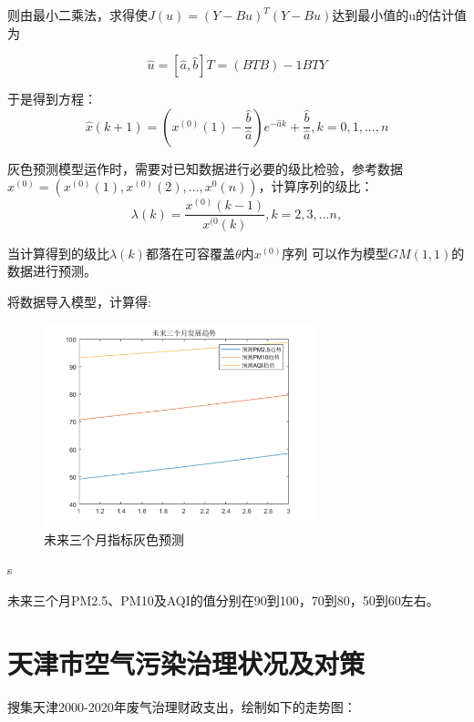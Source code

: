 \documentclass[UTF8]{ctexart}
\begin{document}
则由最小二乘法，求得使$J(u)=(Y-Bu)^T(Y-Bu)$达到最小值的u的估计值为

\begin{equation}
    \hat{u}=[\hat{a},\hat{b}]T=(BTB)-1BTY
\end{equation}

于是得到方程：
\begin{equation}
    \hat{x}(k+1)=(x^{(0)}(1)-\frac{\hat{b}}{\hat{a}})e^{-\hat{a}k}+\frac{\hat{b}}{\hat{a}},k=0,1,...,n 
\end{equation}

灰色预测模型运作时，需要对已知数据进行必要的级比检验，参考数据$x^{(0)}=(x^{(0)}(1),x^{(0)}(2),...,x^0(n))$，计算序列的级比：
\begin{equation}
    \lambda(k)=\frac{x^{(0)}(k-1)}{x^{(0}(k)},k=2,3,...n, 
\end{equation}

当计算得到的级比$\lambda(k)$都落在可容覆盖$\theta$内$x^{(0)}$序列 可以作为模型$GM(1,1)$的数据进行预测。

将数据导入模型，计算得:
\begin{figure}[H] %
    \centering %
    \includegraphics[width=0.7\textwidth]{./picture/hsyc2.png} %
    \caption{未来三个月指标灰色预测} 
\end{figure}s

未来三个月PM2.5、PM10及AQI的值分别在90到100，70到80，50到60左右。

\newpage
\section{天津市空气污染治理状况及对策}
搜集天津2000-2020年废气治理财政支出，绘制如下的走势图：
\end{document}

